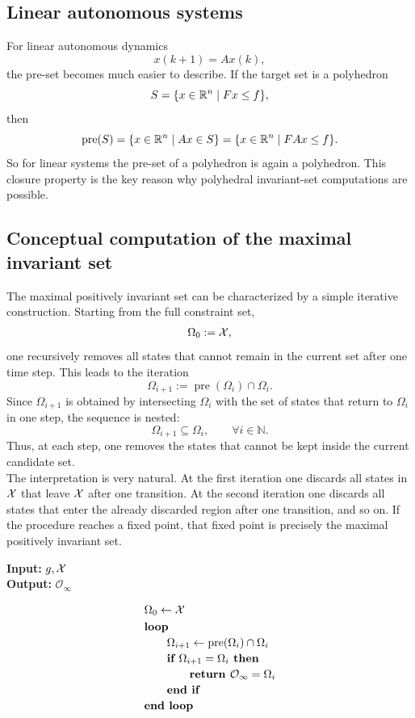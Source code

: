 \subsection{Linear autonomous systems}

For linear autonomous dynamics
\[
x(k+1)=Ax(k),
\]
the pre-set becomes much easier to describe. If the target set is a polyhedron
\[
S=\{x\in \mathbb{R}^n \mid Fx\leq f\},
\]
then
\[
\operatorname{pre}(S)
=
\{x\in \mathbb{R}^n \mid Ax\in S\}
=
\{x\in \mathbb{R}^n \mid FAx\leq f\}.
\]
So for linear systems the pre-set of a polyhedron is again a polyhedron. This closure property is
the key reason why polyhedral invariant-set computations are possible.

\subsection{Conceptual computation of the maximal invariant set}

The maximal positively invariant set can be characterized by a simple iterative construction.
Starting from the full constraint set,
\[
\Omega_0 := \mathcal{X},
\]
one recursively removes all states that cannot remain in the current set after one time step. This
leads to the iteration
\[
\Omega_{i+1}:=\operatorname{pre}(\Omega_i)\cap \Omega_i.
\]
Since \(\Omega_{i+1}\) is obtained by intersecting \(\Omega_i\) with the set of states that return to
\(\Omega_i\) in one step, the sequence is nested:
\[
\Omega_{i+1}\subseteq \Omega_i, \qquad \forall i\in\mathbb N.
\]
Thus, at each step, one removes the states that cannot be kept inside the current candidate set.\\
The interpretation is very natural. At the first iteration one discards all states in \(\mathcal{X}\) that leave
\(\mathcal{X}\) after one transition. At the second iteration one discards all states that enter the already
discarded region after one transition, and so on. If the procedure reaches a fixed point, that fixed
point is precisely the maximal positively invariant set.

\begin{theorembox}
\textbf{Input:} \(g,\mathcal{X}\)\\
\textbf{Output:} \(\mathcal O_\infty\)

\[
\begin{array}{l}
\Omega_0 \leftarrow \mathcal{X} \\[0.3em]
\textbf{loop} \\[0.2em]
\qquad \Omega_{i+1} \leftarrow \operatorname{pre}(\Omega_i)\cap \Omega_i \\[0.2em]
\qquad \textbf{if } \Omega_{i+1}=\Omega_i \textbf{ then} \\[0.2em]
\qquad\qquad \textbf{return } \mathcal O_\infty=\Omega_i \\[0.2em]
\qquad \textbf{end if} \\[0.2em]
\textbf{end loop}
\end{array}
\]
\end{theorembox}

